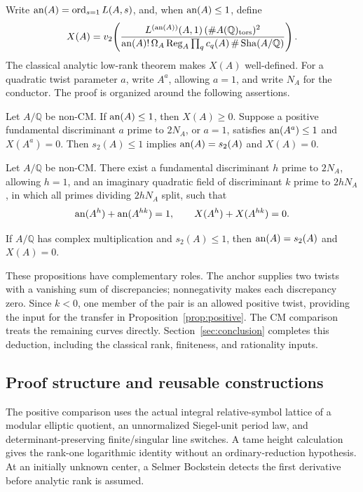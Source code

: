 Write \(\operatorname{an}(A)=\operatorname{ord}_{s=1}L(A,s)\), and, when
\(\operatorname{an}(A)\leq1\), define
\[
 X(A)=v_2\!\left(
 \frac{L^{(\operatorname{an}(A))}(A,1)\,(\#A(\mathbb Q)_{\mathrm{tors}})^2}
 {\operatorname{an}(A)!\,\Omega_A\operatorname{Reg}_A\prod_qc_q(A)\,\#\operatorname{Sha}(A/\mathbb Q)}
 \right).
\]
The classical analytic low-rank theorem makes \(X(A)\) well-defined.
For a quadratic twist parameter \(a\), write \(A^a\), allowing
\(a=1\), and write \(N_A\) for the conductor.  The proof is organized
around the following assertions.

\begin{proposition}\label{prop:positive}
Let \(A/\mathbb Q\) be non-CM.  If \(\operatorname{an}(A)\leq1\), then
\(X(A)\geq0\).  Suppose a positive fundamental discriminant \(a\)
prime to \(2N_A\), or \(a=1\), satisfies
\(\operatorname{an}(A^a)\leq1\) and \(X(A^a)=0\).  Then \(s_2(A)\leq1\)
implies \(\operatorname{an}(A)=s_2(A)\) and \(X(A)=0\).
\end{proposition}

\begin{proposition}\label{prop:anchor}
Let \(A/\mathbb Q\) be non-CM.  There exist a fundamental
discriminant \(h\) prime to \(2N_A\), allowing \(h=1\), and an
imaginary quadratic field of discriminant \(k\) prime to \(2hN_A\),
in which all primes dividing \(2hN_A\) split, such that
\[
 \operatorname{an}(A^h)+\operatorname{an}(A^{hk})=1,
 \qquad X(A^h)+X(A^{hk})=0.
\]
\end{proposition}

\begin{proposition}[CM comparison]\label{prop:cm}
If \(A/\mathbb Q\) has complex multiplication and \(s_2(A)\leq1\),
then \(\operatorname{an}(A)=s_2(A)\) and \(X(A)=0\).
\end{proposition}

These propositions have complementary roles. The anchor supplies two
twists with a vanishing sum of discrepancies; nonnegativity makes each
discrepancy zero. Since \(k<0\), one member of the pair is an allowed
positive twist, providing the input for the transfer in
Proposition~\ref{prop:positive}. The CM comparison treats the remaining
curves directly. Section~\ref{sec:conclusion} completes this deduction,
including the classical rank, finiteness, and rationality inputs.

\subsection{Proof structure and reusable constructions}

The positive comparison uses the actual integral relative-symbol
lattice of a modular elliptic quotient, an unnormalized Siegel-unit
period law, and determinant-preserving finite/singular line switches.
A tame height calculation gives the rank-one logarithmic identity
without an ordinary-reduction hypothesis.  At an initially unknown
center, a Selmer Bockstein detects the first derivative before analytic
rank is assumed.


